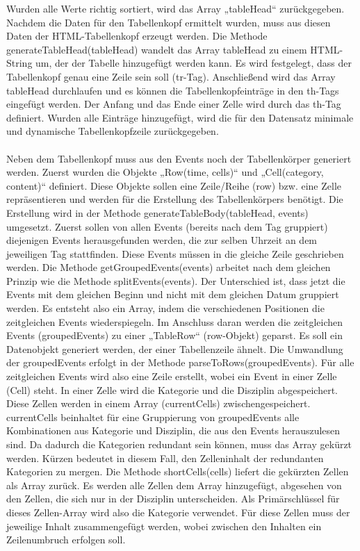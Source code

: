{Wurden alle Werte richtig sortiert, wird das Array „tableHead“ zurückgegeben.
Nachdem die Daten für den Tabellenkopf ermittelt wurden, muss aus diesen Daten der HTML-Tabellenkopf erzeugt werden. Die Methode generateTableHead(tableHead) wandelt das Array tableHead zu einem HTML-String um, der der Tabelle hinzugefügt werden kann. Es wird festgelegt, dass der Tabellenkopf genau eine Zeile sein soll (tr-Tag). Anschließend wird das Array tableHead durchlaufen und es können die Tabellenkopfeinträge in den th-Tags eingefügt werden. Der Anfang und das Ende einer Zelle wird durch das th-Tag definiert. Wurden alle Einträge hinzugefügt, wird die für den Datensatz minimale und dynamische Tabellenkopfzeile zurückgegeben.\\
\\
Neben dem Tabellenkopf muss aus den Events noch der Tabellenkörper generiert werden. Zuerst wurden die Objekte „Row(time, cells)“ und „Cell(category, content)“ definiert. Diese Objekte sollen eine Zeile/Reihe (row) bzw. eine Zelle repräsentieren und werden für die Erstellung des Tabellenkörpers benötigt. 
Die Erstellung wird in der Methode generateTableBody(tableHead, events) umgesetzt. Zuerst sollen von allen Events (bereits nach dem Tag gruppiert) diejenigen Events herausgefunden werden, die zur selben Uhrzeit an dem jeweiligen Tag stattfinden. Diese Events müssen in die gleiche Zeile geschrieben werden. Die Methode getGroupedEvents(events) arbeitet nach dem gleichen Prinzip wie die Methode splitEvents(events). Der Unterschied ist, dass jetzt die Events mit dem gleichen Beginn und nicht mit dem gleichen Datum gruppiert werden. Es entsteht also ein Array, indem die verschiedenen Positionen die zeitgleichen Events wiederspiegeln.
Im Anschluss daran werden die zeitgleichen Events (groupedEvents) zu einer „TableRow“ (row-Objekt) geparst. Es soll ein Datenobjekt generiert werden, der einer Tabellenzeile ähnelt. Die Umwandlung der groupedEvents erfolgt in der Methode parseToRows(groupedEvents). Für alle zeitgleichen Events wird also eine Zeile erstellt, wobei ein Event in einer Zelle (Cell) steht. In einer Zelle wird die Kategorie und die Disziplin abgespeichert. Diese Zellen werden in einem Array (currentCells) zwischengespeichert. currentCells beinhaltet für eine Gruppierung von groupedEvents alle Kombinationen aus Kategorie und Disziplin, die aus den Events herauszulesen sind. Da dadurch die Kategorien redundant sein können, muss das Array gekürzt werden. Kürzen bedeutet in diesem Fall, den Zelleninhalt der redundanten Kategorien zu mergen.
Die Methode shortCells(cells) liefert die gekürzten Zellen als Array zurück. Es werden alle Zellen dem Array hinzugefügt, abgesehen von den Zellen, die sich nur in der Disziplin unterscheiden. Als Primärschlüssel für dieses Zellen-Array wird also die Kategorie verwendet. Für diese Zellen muss der jeweilige Inhalt zusammengefügt werden, wobei zwischen den Inhalten ein Zeilenumbruch erfolgen soll. 
}
